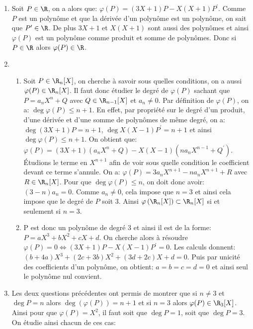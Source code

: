 \documentclass[a4paper, 11pt,reqno]{article}
\begin{document}
\begin{correction}  \;
	\begin{enumerate}
		\item Soit $P\in\R$, on a alors que: $\varphi(P)=(3X+1)P-X(X+1)P^{\prime}$. Comme $P$ est un polyn\^{o}me et que la d\'eriv\'ee d'un polyn\^{o}me est un polyn\^{o}me, on sait que $P^{\prime}\in\R$. De plus $3X+1$ et $X(X+1)$ sont aussi des polyn\^{o}mes et ainsi $\varphi(P)$ est un polyn\^{o}me comme produit et somme de polyn\^{o}mes. Donc si $P\in\R$ alors $\varphi(P)\in\R$.
		\item
		      \begin{enumerate}
			      \item Soit $P\in\R_n\lbrack X\rbrack$, on cherche \`{a} savoir sous quelles conditions, on a aussi $\varphi(P)\in\R_n\lbrack X\rbrack$. Il faut donc \'etudier le degr\'e de $\varphi(P)$ sachant que $P=a_nX^n+Q$ avec $Q\in\R_{n-1}\lbrack X\rbrack$ et $a_n\not= 0$. Par d\'efinition de $\varphi(P)$, on a: $\deg{\varphi(P)}\leq n+1$. En effet, par propri\'et\'e sur le degr\'e d'un produit, d'une d\'eriv\'ee et d'une somme de polyn\^{o}mes de m\^{e}me degr\'e, on a: $\deg{(3X+1)P=n+1}$, $\deg{X(X-1)P^{\prime}}=n+1$ et ainsi $\deg{\varphi(P)}\leq n+1$. On obtient que: $\varphi(P)=(3X+1)(a_nX^n+Q)-X(X-1)(na_n X^{n-1}+Q^{\prime})$. \'Etudions le terme en $X^{n+1}$ afin de voir sous quelle condition le coefficient devant ce terme s'annule. On a: $\varphi(P)=3a_n X^{n+1}-na_n X^{n+1}+R$ avec $R\in\R_{n}\lbrack X\rbrack$. Pour que $\deg{\varphi(P)}\leq n$, on doit donc avoir: $(3-n)a_n=0$. Comme $a_n\not= 0$, cela impose que $n=3$ et ainsi cela impose que le degr\'e de $P$ soit 3. Ainsi $\varphi\left( \R_n\lbrack X\rbrack\right)\subset \R_n\lbrack X\rbrack$ si et seulement si $n=3$.
			      \item P est donc un polyn\^{o}me de degr\'e 3 et ainsi il est de la forme: $P=aX^3+bX^2+cX+d$. On cherche alors \`{a} r\'esoudre $\varphi(P)=0\Leftrightarrow (3X+1)P-X(X-1)P^{\prime}=0$. Les calculs donnent: $(b+4a)X^3+(2c+3b)X^2+(3d+2c)X+d=0$. Puis par unicit\'e des coefficients d'un polyn\^{o}me, on obtient: $a=b=c=d=0$ et ainsi seul le polyn\^{o}me nul convient.
		      \end{enumerate}
		\item Les deux questions pr\'ec\'edentes ont permis de montrer que si $n\not= 3$ et $\deg{P}=n$ alors $\deg{(\varphi(P))}=n+1$ et si $n=3$ alors $\varphi(P)\in\R_3\lbrack X\rbrack$. Ainsi pour que $\varphi(P)=X^2$, il faut soit que $\deg{P}=1$, soit que $\deg{P}=3$. On \'etudie ainsi chacun de ces cas:

\end{enumerate}
\end{correction}
\end{document}
